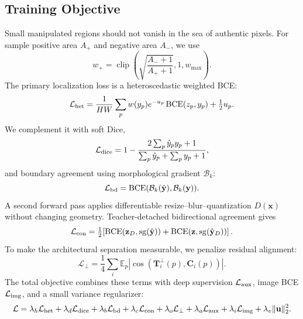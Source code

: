 \documentclass[journal]{IEEEtran}
\begin{document}
\subsection{Training Objective}
Small manipulated regions should not vanish in the sea of authentic pixels.  For
sample positive area $A_+$ and negative area $A_-$, we use
\begin{equation}
w_+=\operatorname{clip}\!\left(\sqrt{\frac{A_-+1}{A_++1}},1,w_{\max}\right).
\label{eq:area}
\end{equation}
The primary localization loss is a heteroscedastic weighted BCE:
\begin{equation}
\mathcal L_{\rm het}=\frac{1}{HW}\sum_p w(y_p)e^{-u_p}
\operatorname{BCE}(z_p,y_p)+\tfrac12 u_p.
\label{eq:hetero}
\end{equation}
We complement it with soft Dice,
\begin{equation}
\mathcal L_{\rm dice}=1-\frac{2\sum_p\hat y_py_p+1}
{\sum_p\hat y_p+\sum_py_p+1},
\label{eq:dice}
\end{equation}
and boundary agreement using morphological gradient $\mathcal B_k$:
\begin{equation}
\mathcal L_{\rm bd}=\operatorname{BCE}(\mathcal B_k(\hat{\mathbf y}),
\mathcal B_k(\mathbf y)).
\label{eq:boundary}
\end{equation}
A second forward pass applies differentiable resize--blur--quantization
$D(\mathbf x)$ without changing geometry.  Teacher-detached bidirectional
agreement gives
\begin{equation}
\mathcal L_{\rm con}=\tfrac12\!\left[
\operatorname{BCE}(\mathbf z_D,\operatorname{sg}(\hat{\mathbf y}))+
\operatorname{BCE}(\mathbf z,\operatorname{sg}(\hat{\mathbf y}_D))\right].
\label{eq:consistency}
\end{equation}
To make the architectural separation measurable, we penalize residual alignment:
\begin{equation}
\mathcal L_{\perp}=\frac14\sum_i
\mathbb E_p\left|\cos(\mathbf T_i^{\perp}(p),\mathbf C_i(p))\right|.
\label{eq:orthloss}
\end{equation}
The total objective combines these terms with deep supervision
$\mathcal L_{\rm aux}$, image BCE $\mathcal L_{\rm img}$, and a small variance
regularizer:
\begin{equation}
\mathcal L=\lambda_h\mathcal L_{\rm het}+\lambda_d\mathcal L_{\rm dice}
+\lambda_b\mathcal L_{\rm bd}+\lambda_c\mathcal L_{\rm con}
+\lambda_o\mathcal L_{\perp}+\lambda_a\mathcal L_{\rm aux}
+\lambda_i\mathcal L_{\rm img}+\lambda_v\|\mathbf u\|_2^2.
\label{eq:total}
\end{equation}
\end{document}
